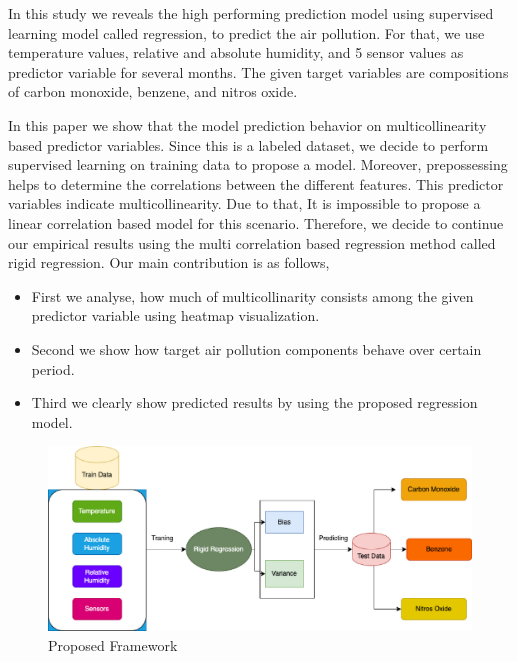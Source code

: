 {}
In this study we reveals the high performing prediction model
using supervised learning model called regression, to predict the air pollution.
For that, we use temperature values, relative and absolute humidity, 
and 5 sensor values as predictor variable for several months.
The given target variables are compositions of carbon monoxide, benzene, and nitros oxide.

{}
In this paper we show that the model prediction behavior on multicollinearity based predictor variables. 
Since this is a labeled dataset, we 
decide to perform supervised learning on training data to propose a model.
Moreover, prepossessing helps to determine the 
correlations between the different features.
This predictor variables indicate multicollinearity.
Due to that, It is impossible to propose a linear correlation based model for this scenario. 
Therefore, we decide to continue our empirical 
results using the multi correlation based regression method called rigid regression. 
Our main contribution is as follows,
\begin{itemize}
	\item First we analyse, how much of multicollinarity consists among the given predictor variable using heatmap visualization.
	\item Second we show how target air pollution components behave over certain period.
	\item Third we clearly show predicted results by using the proposed regression model.
\end{itemize}
\begin{figure}
  \centering
 \includegraphics[width=1.0\linewidth,height=0.6\linewidth]{graphics//Fig_AirPrediction.eps}
  \caption{Proposed Framework} \label{Fig_AirPrediction}
\end{figure}

